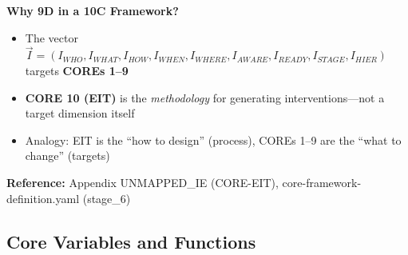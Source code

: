 \begin{tcolorbox}[colback=yellow!5!white, colframe=yellow!75!black,
    title=\textbf{IMPORTANT: Symbol Disambiguation}]
\textbf{Why 9D in a 10C Framework?}
\begin{itemize}[nosep]
    \item The vector $\vec{I} = (I_{WHO}, I_{WHAT}, I_{HOW}, I_{WHEN}, I_{WHERE}, I_{AWARE}, I_{READY}, I_{STAGE}, I_{HIER})$ targets \textbf{COREs 1--9}
    \item \textbf{CORE 10 (EIT)} is the \textit{methodology} for generating interventions---not a target dimension itself
    \item Analogy: EIT is the ``how to design'' (process), COREs 1--9 are the ``what to change'' (targets)
\end{itemize}

\textbf{Reference:} Appendix UNMAPPED_IE (CORE-EIT), core-framework-definition.yaml (stage\_6)

\end{tcolorbox}

\subsection{Core Variables and Functions}

